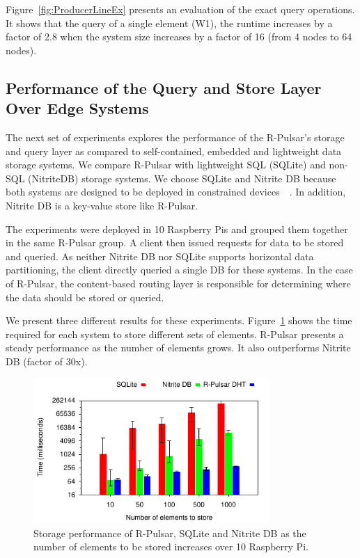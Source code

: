 Figure~\ref{fig:ProducerLineEx} presents an evaluation of the exact query operations. It shows that the query of a single element (W1), the runtime increases by a factor of 2.8 when the system size increases by a factor of 16 (from 4 nodes to 64 nodes).

\subsection{Performance of the Query and Store Layer Over Edge Systems}

The next set of experiments explores the performance of the R-Pulsar's storage and query layer as compared to self-contained, embedded and lightweight data storage systems. We compare R-Pulsar with lightweight SQL (SQLite) and non-SQL (NitriteDB) storage systems. We choose SQLite and Nitrite DB because  both systems are designed to be deployed in constrained devices~\cite{sqlite}~\cite{nitrite}. In addition, Nitrite DB is a key-value store like R-Pulsar. 

The experiments were deployed in 10 Raspberry Pis and grouped them together in the same R-Pulsar group. A client then issued requests for data to be stored and queried. As neither Nitrite DB nor SQLite supports horizontal data partitioning, the client directly queried a single DB for these systems. In the case of R-Pulsar, the content-based routing layer is responsible for determining where the data should be stored or queried.

We present three different results for these experiments. Figure~\ref{fig:DBInsertBar} shows the time required for each system to store different sets of elements. R-Pulsar presents a steady performance as the number of elements grows. It also outperforms Nitrite DB (factor of 30x).

\begin{figure}[h!]
  \centering
  \includegraphics[width=0.8\textwidth]{Results/DBInsertBar}
  \caption{Storage performance of R-Pulsar, SQLite and Nitrite DB as the number of elements to be stored increases over 10 Raspberry Pi.}
  \label{fig:DBInsertBar}
\end{figure}

